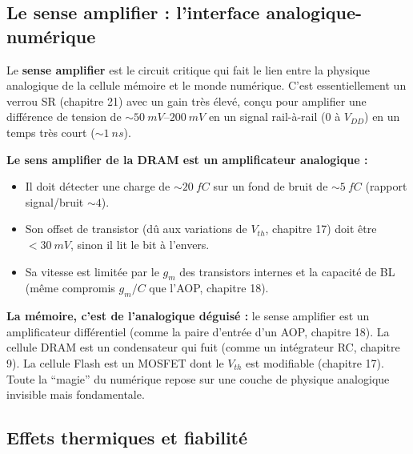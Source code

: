 \documentclass[12pt,a4paper,twoside]{book}
\begin{document}
\subsection{Le sense amplifier : l'interface analogique-numérique}

\begin{formule}
Le \textbf{sense amplifier} est le circuit critique qui fait le lien entre la physique analogique de la cellule mémoire et le monde numérique. C'est essentiellement un verrou SR (chapitre 21) avec un gain très élevé, conçu pour amplifier une différence de tension de $\sim\SI{50}{mV}$--$\SI{200}{mV}$ en un signal rail-à-rail ($0$ à $V_{DD}$) en un temps très court ($\sim\SI{1}{ns}$).

\textbf{Le sens amplifier de la DRAM est un amplificateur analogique :}
\begin{itemize}[nosep]
\item Il doit détecter une charge de $\sim\SI{20}{fC}$ sur un fond de bruit de $\sim\SI{5}{fC}$ (rapport signal/bruit $\sim 4$).
\item Son offset de transistor (dû aux variations de $V_{th}$, chapitre 17) doit être $< \SI{30}{mV}$, sinon il lit le bit à l'envers.
\item Sa vitesse est limitée par le $g_m$ des transistors internes et la capacité de BL (même compromis $g_m/C$ que l'AOP, chapitre 18).
\end{itemize}
\end{formule}

\begin{intuition}
\textbf{La mémoire, c'est de l'analogique déguisé :} le sense amplifier est un amplificateur différentiel (comme la paire d'entrée d'un AOP, chapitre 18). La cellule DRAM est un condensateur qui fuit (comme un intégrateur RC, chapitre 9). La cellule Flash est un MOSFET dont le $V_{th}$ est modifiable (chapitre 17). Toute la ``magie'' du numérique repose sur une couche de physique analogique invisible mais fondamentale.
\end{intuition}

\subsection{Effets thermiques et fiabilité}
\end{document}
